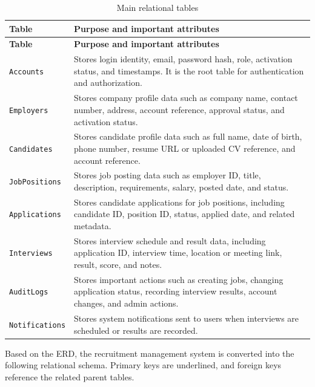 \documentclass[11pt,a4paper]{report}
\begin{document}
\begin{longtable}{L{0.24\textwidth}L{0.66\textwidth}}
\caption{Main relational tables}
\label{tab:relational-schema}\\
\toprule
\textbf{Table} & \textbf{Purpose and important attributes} \\
\midrule
\endfirsthead
\toprule
\textbf{Table} & \textbf{Purpose and important attributes} \\
\midrule
\endhead
\texttt{Accounts} & Stores login identity, email, password hash, role, activation status, and timestamps. It is the root table for authentication and authorization. \\
\texttt{Employers} & Stores company profile data such as company name, contact number, address, account reference, approval status, and activation status. \\
\texttt{Candidates} & Stores candidate profile data such as full name, date of birth, phone number, resume URL or uploaded CV reference, and account reference. \\
\texttt{JobPositions} & Stores job posting data such as employer ID, title, description, requirements, salary, posted date, and status. \\
\texttt{Applications} & Stores candidate applications for job positions, including candidate ID, position ID, status, applied date, and related metadata. \\
\texttt{Interviews} & Stores interview schedule and result data, including application ID, interview time, location or meeting link, result, score, and notes. \\
\texttt{AuditLogs} & Stores important actions such as creating jobs, changing application status, recording interview results, account changes, and admin actions. \\
\texttt{Notifications} & Stores system notifications sent to users when interviews are scheduled or results are recorded. \\
\bottomrule
\end{longtable}

Based on the ERD, the recruitment management system is converted into the following relational schema. Primary keys are underlined, and foreign keys reference the related parent tables.
\end{document}
